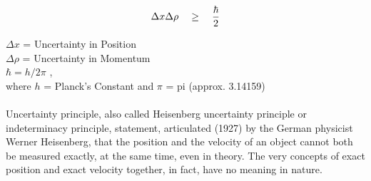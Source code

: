 \begin{Large}
\begin{equation}
\Delta x\Delta\rho\quad\ge\quad{\hbar \over 2}
\end{equation}
\end{Large}


$\Delta x$ = Uncertainty in Position\\
$\Delta\rho$ = Uncertainty in Momentum\\
$\hbar={{h}/{2\pi}}$ ,\\
where $h$ = Planck's Constant and $\pi$ = pi (approx. 3.14159)
\\\\
Uncertainty principle, also called Heisenberg uncertainty principle or indeterminacy principle, statement, articulated (1927) by the German physicist Werner Heisenberg, that the position and the velocity of an object cannot both be measured exactly, at the same time, even in theory. The very concepts of exact position and exact velocity together, in fact, have no meaning in nature.







